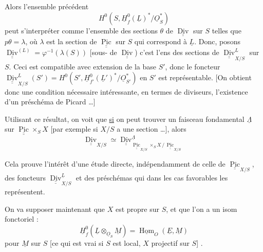 Alors l'ensemble précédent
\[
H^0(S,\underline H_f^0(\underline L)^*/\underline O_S^*)
\]
peut s'interpréter comme l'ensemble des sections $\theta$ de $\underline{\underline{\operatorname{Div}}}$ sur $S$ telles que
$p\theta=\lambda$, où $\lambda$ est la section de $\underline{\underline{\operatorname{Pic}}}$ sur $S$ qui correspond à $\underline L$. Donc, posons $\underline{\underline{\operatorname{Div}}}^{(L)}=\varphi^{-1}(\lambda(S))$ [sous- de $\underline{\underline{\operatorname{Div}}}$) c'est l'ens des sections de $\underline{\underline{\operatorname{Div}}}_{X/S}^{L}$ sur $S$.  Ceci est compatible avec extension de la base $S'$, donc le foncteur $\underline{\underline{\operatorname{Div}}}_{X/S}^{L}(S')=H^0(S',\underline H_{f'}^0(\underline L')^*/\underline O_{S'}^*)$ en $S'$ est représentable.  [On obtient donc une condition nécessaire intéressante, en termes de diviseurs,  l'existence
d'un préschéma de Picard \ldots] 

Utilisant ce résultat, on voit que \uline{si} on peut trouver un faisceau  fondamental  $\underline\Lambda$ sur $\underline{\underline{\operatorname{Pic}}}\times_S X$  [par exemple si $X/S$ a une section \ldots], alors 
\[
\underline{\underline{\operatorname{Div}}}_{X/S}\simeq
\underline{\underline{\operatorname{Div}}}^{\underline\Lambda}_{\underline{\underline{\operatorname{Pic}}}_{X/S}\times_S X\,/\,\underline{\underline{\operatorname{Pic}}}_{X/S}}
\]

Cela prouve l'intérêt d'une étude directe, indépendamment de celle de $\underline{\underline{\operatorname{Pic}}}_{X/S}$, des foncteurs  $\underline{\underline{\operatorname{Div}}}_{X/S}^{\underline L}$ et des  préschémas qui dans les cas favorables les représentent.

On va supposer maintenant que $X$ est propre  sur $S$, et que l'on a un isom fonctoriel :
\[
\underline H_f^0(\underline L\otimes_{\underline O_S}\underline M)=\underline{\operatorname{Hom}}_{O}(\underline E,\underline M)
\]
pour $\underline M$  sur $S$ [ce qui est vrai si $S$ est local,  $X$ projectif sur $S$] \deleted{\unsure{$X$ quasi libre sur $S$} \ldots]}.

